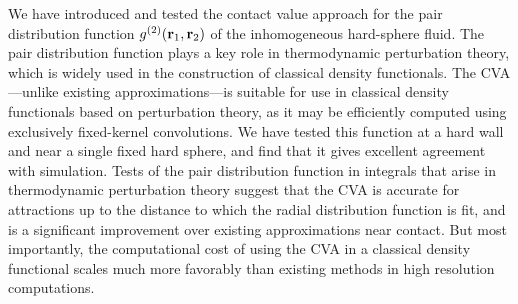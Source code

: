 We have introduced and tested the contact value approach for the pair
distribution function $g^{(2)}(\textbf{r}_1,\textbf{r}_2)$ of the inhomogeneous
hard-sphere fluid.  The pair distribution function plays a key role in
thermodynamic perturbation theory, which is widely used in the
construction of classical density functionals.  The CVA---unlike
existing approximations---is suitable for use in classical density
functionals based on perturbation theory, as it may be efficiently
computed using exclusively fixed-kernel convolutions.  We have tested
this function at a hard wall and near a single fixed hard sphere, and
find that it gives excellent agreement with simulation.  Tests of the
pair distribution function in integrals that arise in thermodynamic
perturbation theory suggest that the CVA is accurate for attractions
up to the distance to which the radial distribution function is fit,
and is a significant improvement over existing approximations near
contact.  But most importantly, the computational cost of using the
CVA in a classical density functional scales much more favorably than
existing methods in high resolution computations.
